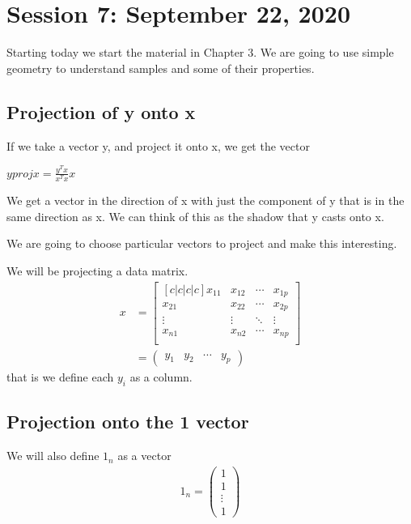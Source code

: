 \chapter{Session 7: September 22, 2020}
\label{seventh}
Starting today we start the material in Chapter 3. We are going to use simple geometry to understand samples and some of their properties.

\section{Projection of y onto x}
If we take a vector y, and project it onto x, we get the vector

$yprojx = \frac{y^T x}{x^T x}x$

We get a vector in the direction of x with just the component of y that is in the same direction as x. We can think of this as the shadow that y casts onto x.

We are going to choose particular vectors to project and make this interesting.

We will be projecting a data matrix.
\begin{align*}
    x &= \begin{bmatrix}[c|c|c|c]
    x_{11} & x_{12} & \cdots & x_{1p} \\
    x_{21} & x_{22} & \cdots & x_{2p} \\
    \vdots & \vdots & \ddots & \vdots \\
    x_{n1} & x_{n2} & \cdots & x_{np} \\
    \end{bmatrix} \\
    &= 
    \begin{pmatrix}
    y_1 & y_2 & \cdots & y_p
    \end{pmatrix}
\end{align*}
that is we define each $y_i$ as a column.

\section{Projection onto the 1 vector}
We will also define $1_n$ as a vector
\begin{align*}
    1_n = \begin{pmatrix}
    1 \\ 1 \\ \vdots \\ 1
    \end{pmatrix}
\end{align*}

